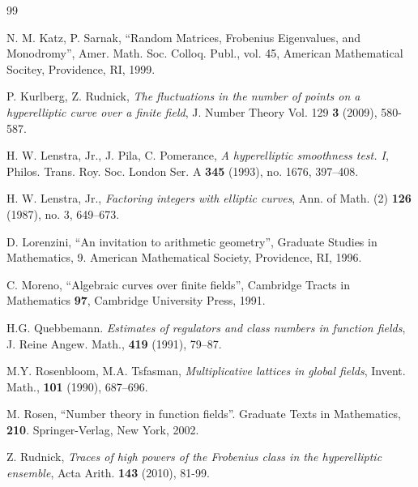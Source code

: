 \documentclass[12pt]{amsart}
\theoremstyle{plain}
\begin{document}
\begin{thebibliography}{99}

 N. M. Katz, P. Sarnak, ``Random Matrices, Frobenius Eigenvalues, and Monodromy'', Amer. Math. Soc. Colloq. Publ., vol. 45, American Mathematical Socitey, Providence, RI, 1999.


 P. Kurlberg, Z. Rudnick, \emph{The fluctuations in the number of points on a hyperelliptic curve over a finite field}, J. Number Theory Vol. 129 {\bf 3} (2009), 580-587.

 H. W. Lenstra, Jr., J. Pila, C. Pomerance, \emph{A hyperelliptic smoothness test. I}, Philos. Trans. Roy. Soc. London Ser. A {\bf 345} (1993), no. 1676, 397--408.

 H. W. Lenstra, Jr., \emph{Factoring integers with elliptic curves}, Ann. of Math. (2) {\bf 126} (1987), no. 3, 649--673.


 D. Lorenzini, ``An invitation to arithmetic geometry'', Graduate Studies in Mathematics, 9. American Mathematical Society, Providence, RI, 1996.


 C. Moreno, ``Algebraic curves over finite fields'', Cambridge Tracts in Mathematics {\bf 97}, Cambridge University Press, 1991.

 H.G. Quebbemann. \emph{Estimates of regulators and class numbers in function fields}, J. Reine Angew. Math., {\bf 419} (1991), 79--87.

 M.Y. Rosenbloom, M.A. Tsfasman, \emph{Multiplicative lattices in global fields}, Invent. Math., {\bf 101} (1990), 687--696.

 M. Rosen, ``Number theory in function fields''. Graduate Texts in Mathematics, {\bf 210}. Springer-Verlag, New York, 2002.

 Z. Rudnick, \emph{Traces of high powers of the Frobenius class in the hyperelliptic ensemble}, Acta Arith. {\bf 143} (2010), 81-99.



\end{thebibliography}
\end{document}
